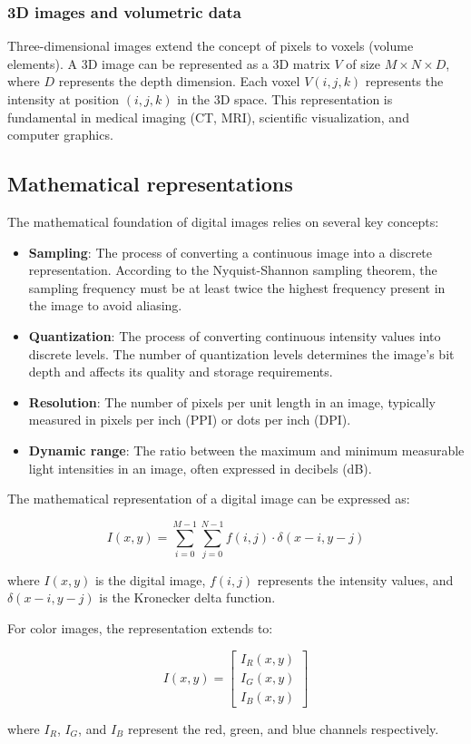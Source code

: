 \subsubsection{3D images and volumetric data}
Three-dimensional images extend the concept of pixels to voxels
(volume elements). A 3D image can be represented as a 3D matrix $V$
of size $M \times N \times D$, where $D$ represents the depth
dimension. Each voxel $V(i,j,k)$ represents the intensity at position
$(i,j,k)$ in the 3D space. This representation is fundamental in
medical imaging (CT, MRI), scientific visualization, and computer graphics.

\subsection{Mathematical representations}

The mathematical foundation of digital images relies on several key concepts:

\begin{itemize}
  \item \textbf{Sampling}: The process of converting a continuous
    image into a discrete representation. According to the
    Nyquist-Shannon sampling theorem, the sampling frequency must be
    at least twice the highest frequency present in the image to avoid aliasing.

  \item \textbf{Quantization}: The process of converting continuous
    intensity values into discrete levels. The number of quantization
    levels determines the image's bit depth and affects its quality
    and storage requirements.

  \item \textbf{Resolution}: The number of pixels per unit length in
    an image, typically measured in pixels per inch (PPI) or dots per
    inch (DPI).

  \item \textbf{Dynamic range}: The ratio between the maximum and
    minimum measurable light intensities in an image, often expressed
    in decibels (dB).
\end{itemize}

The mathematical representation of a digital image can be expressed as:

\begin{equation}
  I(x,y) = \sum_{i=0}^{M-1} \sum_{j=0}^{N-1} f(i,j) \cdot \delta(x-i, y-j)
\end{equation}

where $I(x,y)$ is the digital image, $f(i,j)$ represents the
intensity values, and $\delta(x-i, y-j)$ is the Kronecker delta function.

For color images, the representation extends to:

\begin{equation}
  I(x,y) =
  \begin{bmatrix}
    I_R(x,y) \\
    I_G(x,y) \\
    I_B(x,y)
  \end{bmatrix}
\end{equation}

where $I_R$, $I_G$, and $I_B$ represent the red, green, and blue
channels respectively.
